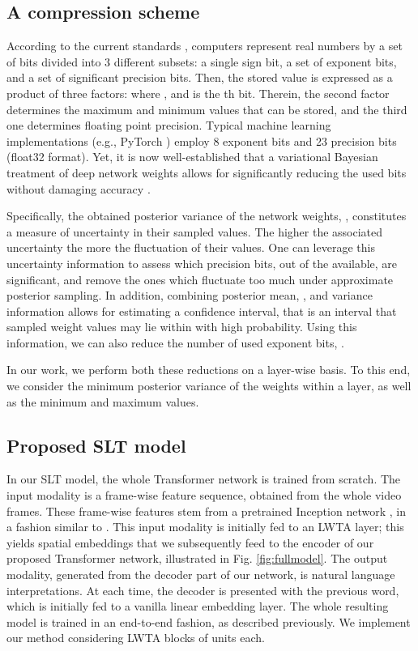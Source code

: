 \documentclass[10pt,twocolumn,letterpaper]{article}
\begin{document}
\subsection{A compression scheme}

According to the current standards \cite{sites2008ieee}, computers represent real numbers by a set of bits divided into 3 different subsets:  a single sign bit, a set of  exponent bits, and a set of  significant precision bits. Then, the stored value is expressed as a product of three factors:
 where , and  is the th bit. Therein, the second factor determines the maximum and minimum values that can be stored, and the third one determines floating point precision. Typical machine learning implementations (e.g., PyTorch \cite{NEURIPS2019_9015}) employ 8 exponent bits and 23 precision bits (float32 format). Yet, it is now well-established that a variational Bayesian treatment of deep network weights allows for significantly reducing the used bits without damaging  accuracy \cite{panousis2019nonparametric, elan2020}. 

Specifically, the obtained posterior variance of the network weights, , constitutes a measure of uncertainty in their sampled values. The higher the associated uncertainty the more the fluctuation of their values. One can leverage this uncertainty information to assess which precision bits, out of the  available, are significant, and remove the ones which fluctuate too much under approximate posterior sampling. In addition, combining posterior mean, , and variance information allows for estimating a confidence interval, that is an interval that sampled weight values may lie within with high probability. Using this information, we can also reduce the number of used exponent bits, . 

In our work, we perform both these reductions on a layer-wise basis. To this end, we consider the minimum posterior variance  of the weights within a layer, as well as the minimum and maximum  values. 


\subsection{Proposed SLT model}

In our SLT  model, the whole Transformer network is trained from scratch. The input modality is a frame-wise feature sequence, obtained from the whole video frames. These frame-wise features stem from a pretrained Inception network \cite{szegedy2017inception, Koller2020}, in a fashion similar to \cite{Camgoz20}. This input modality is initially fed to an LWTA layer; this yields spatial embeddings that we subsequently feed to the encoder of our proposed Transformer network, illustrated in Fig. \ref{fig:fullmodel}. The output modality, generated from the decoder part of our network, is natural language interpretations. At each time, the decoder is presented with the previous word, which is initially fed to a vanilla linear embedding layer. The whole resulting model is trained in an end-to-end fashion, as described previously. We implement our method considering LWTA blocks of  units each.
\end{document}
